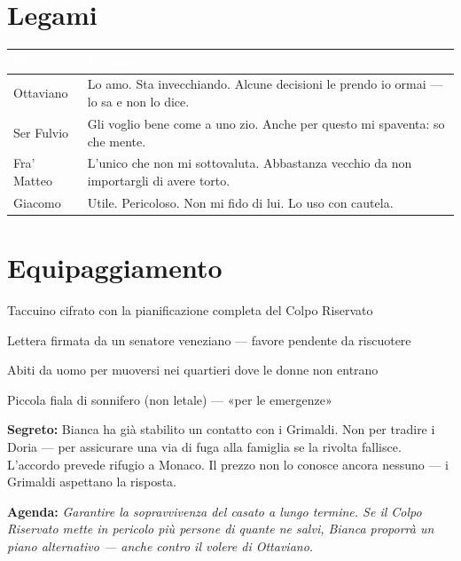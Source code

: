 \section*{Legami}
\begin{table}[h]
\centering\renewcommand{\arraystretch}{1.4}
\begin{tabularx}{\linewidth}{@{}L{2.4cm} X@{}}
  \toprule{}
  \textcolor{white}{\textbf{PG}} & \textcolor{white}{\textbf{Legame}} \\
  \midrule
  Ottaviano & Lo amo. Sta invecchiando. Alcune decisioni le prendo io ormai — lo sa e non lo dice. \\
  Ser Fulvio & Gli voglio bene come a uno zio. Anche per questo mi spaventa: so che mente. \\
  Fra' Matteo & L'unico che non mi sottovaluta. Abbastanza vecchio da non importargli di avere torto. \\
  Giacomo & Utile. Pericoloso. Non mi fido di lui. Lo uso con cautela. \\
  \bottomrule
\end{tabularx}
\end{table}

\section*{Equipaggiamento}
\begin{goldlist}
  \item Taccuino cifrato con la pianificazione completa del Colpo Riservato
  \item Lettera firmata da un senatore veneziano — favore pendente da riscuotere
  \item Abiti da uomo per muoversi nei quartieri dove le donne non entrano
  \item Piccola fiala di sonnifero (non letale) — «per le emergenze»
\end{goldlist}

\clearpage

\begin{secretbox}
  \textbf{Segreto:} Bianca ha già stabilito un contatto con i Grimaldi. Non per tradire i
  Doria — per assicurare una via di fuga alla famiglia se la rivolta fallisce. L'accordo
  prevede rifugio a Monaco. Il prezzo non lo conosce ancora nessuno — i Grimaldi aspettano
  la risposta.

  \medskip\noindent\textcolor{SecretRed}{\textbf{Agenda:}}
  \textit{Garantire la sopravvivenza del casato a lungo termine. Se il Colpo Riservato
  mette in pericolo più persone di quante ne salvi, Bianca proporrà un piano alternativo
  — anche contro il volere di Ottaviano.}
\end{secretbox}

